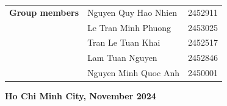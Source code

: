 \begin{titlepage}
\begin{center}
\begin{tabular}{rll}
          \textbf{Group members} & Nguyen Quy Hao Nhien & 2452911 \\ 
          & Le Tran Minh Phuong & 2453025 \\ 
          & Tran Le Tuan Khai & 2452517 \\ 
          & Lam Tuan Nguyen & 2452846 \\ 
          & Nguyen Minh Quoc Anh & 2450001 \\ 
        \end{tabular}
    \end{center}
    \vfill
    \begin{center}
        \textbf{\large Ho Chi Minh City, November 2024}
    \end{center}
\end{titlepage}
\newpage
\tableofcontents
\newpage
\listoffigures
